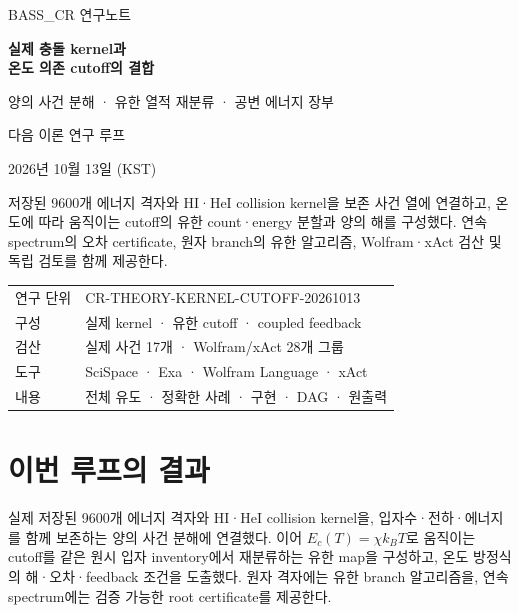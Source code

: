\documentclass[11pt,a4paper]{article}
\begin{document}
\begin{titlepage}
{\color{MidnightBlue}\large BASS\_CR 연구노트\par}
\vspace{16mm}
{\Huge\bfseries 실제 충돌 kernel과\\[3mm]온도 의존 cutoff의 결합\par}
\vspace{8mm}
{\Large 양의 사건 분해 · 유한 열적 재분류 · 공변 에너지 장부\par}
\vspace{12mm}
{\large 다음 이론 연구 루프\par}
\vspace{4mm}
{2026년 10월 13일 (KST)\par}
\vspace{12mm}
\begin{minipage}{.96\textwidth}
\large
저장된 9600개 에너지 격자와 HI·HeI collision kernel을
보존 사건 열에 연결하고, 온도에 따라 움직이는 cutoff의
유한 count·energy 분할과 양의 해를 구성했다.
연속 spectrum의 오차 certificate, 원자 branch의 유한 알고리즘,
Wolfram·xAct 검산 및 독립 검토를 함께 제공한다.
\end{minipage}
\vfill
\begin{tabular}{@{}ll@{}}
연구 단위 & CR-THEORY-KERNEL-CUTOFF-20261013\\
구성 & 실제 kernel · 유한 cutoff · coupled feedback\\
검산 & 실제 사건 17개 · Wolfram/xAct 28개 그룹\\
도구 & SciSpace · Exa · Wolfram Language · xAct\\
내용 & 전체 유도 · 정확한 사례 · 구현 · DAG · 원출력\\
\end{tabular}
\end{titlepage}
\tableofcontents
\clearpage
\hypertarget{uxc774uxbc88-uxb8e8uxd504uxc758-uxacb0uxacfc}{%
\section{이번 루프의 결과}\label{uxc774uxbc88-uxb8e8uxd504uxc758-uxacb0uxacfc}}

실제 저장된 9600개 에너지 격자와 HI·HeI collision kernel을, 입자수·전하·에너지를 함께 보존하는 양의 사건 분해에 연결했다. 이어 \(E_c(T)=\chi k_BT\)로 움직이는 cutoff를 같은 원시 입자 inventory에서 재분류하는 유한 map을 구성하고, 온도 방정식의 해·오차·feedback 조건을 도출했다. 원자 격자에는 유한 branch 알고리즘을, 연속 spectrum에는 검증 가능한 root certificate를 제공한다.
\end{document}
